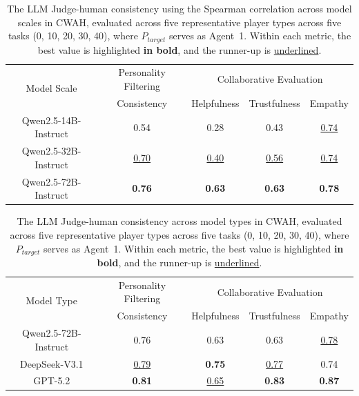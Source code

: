 \documentclass{article}
\theoremstyle{plain}
\theoremstyle{definition}
\theoremstyle{remark}
\begin{document}
\begin{table}[htbp]
  \centering
  \caption{The LLM Judge-human consistency using the Spearman correlation across model scales in CWAH, evaluated across five representative player types across five tasks (0, 10, 20, 30, 40), where $P_{target}$ serves as Agent~1. Within each metric, the best value is highlighted \textbf{in bold}, and the runner-up is \underline{underlined}.}
    \begin{tabular}{c|c|ccc}
    \toprule
    \multirow{2}[2]{*}{Model Scale } & Personality Filtering & \multicolumn{3}{c}{Collaborative Evaluation} \\
          & Consistency & Helpfulness & Trustfulness & Empathy\\
    \midrule
    Qwen2.5-14B-Instruct & 0.54  & 0.28  & 0.43  & \underline{0.74} \\
    Qwen2.5-32B-Instruct & \underline{0.70} & \underline{0.40} & \underline{0.56} & \underline{0.74} \\
    Qwen2.5-72B-Instruct & \textbf{0.76} & \textbf{0.63} & \textbf{0.63} & \textbf{0.78} \\
    \bottomrule
    \end{tabular}%
  \label{apx:tab:scale}%
\end{table}%


\begin{table}[htbp]
  \centering
  \caption{The LLM Judge-human consistency across model types in CWAH, evaluated across five representative player types across five tasks (0, 10, 20, 30, 40), where $P_{target}$ serves as Agent~1. Within each metric, the best value is highlighted \textbf{in bold}, and the runner-up is \underline{underlined}.}
    \begin{tabular}{c|c|ccc}
    \toprule
    \multirow{2}[2]{*}{Model Type } & Personality Filtering & \multicolumn{3}{c}{Collaborative Evaluation} \\
          & Consistency & Helpfulness & Trustfulness & Empathy \\
    \midrule
    Qwen2.5-72B-Instruct & 0.76  & 0.63  & 0.63  & \underline{0.78} \\
    DeepSeek-V3.1 & \underline{0.79} & \textbf{0.75} & \underline{0.77} & 0.74 \\
    GPT-5.2 & \textbf{0.81} & \underline{0.65} & \textbf{0.83} & \textbf{0.87} \\
    \bottomrule
    \end{tabular}%
  \label{apx:tab:type}%
\end{table}%
\end{document}
